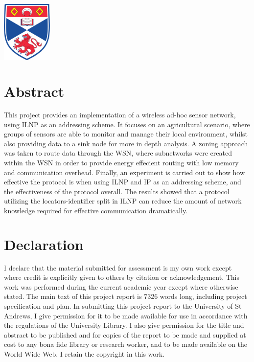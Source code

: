 \documentclass[12pt]{article}
\begin{document}
\begin{titlepage}
\includegraphics[width = 2.5cm]{images/standrewslogo.png}
 

\vfill %

\end{titlepage}


\part*{Abstract}

This project provides an implementation of a wireless ad-hoc sensor network, using ILNP as an addressing scheme. It focuses on an agricultural scenario, where groups of sensors are able to monitor and manage their local environment, whilst also providing data to a sink node for more in depth analysis. A zoning approach was taken to route data through the WSN, where subnetworks were created within the WSN in order to provide energy effecient routing with low memory and communication overhead. Finally, an experiment is carried out to show how effective the protocol is when using ILNP and IP as an addressing scheme, and the effectiveness of the protocol overall. The results showed that a protocol utilizing the locators-identifier split in ILNP can reduce the amount of network knowledge required for effective communication dramatically.

\part*{Declaration}
I declare that the material submitted for
assessment is my own work except where credit is
explicitly given to others by citation or
acknowledgement. This work was performed during
the current academic year except where otherwise
stated.
The main text of this project report is 7326 words long, including project specification and plan.
In submitting this project report to the University of
St Andrews, I give permission for it to be made
available for use in accordance with the regulations of
the University Library. I also give permission for
the title and abstract to be published and for copies of
the report to be made and supplied at cost to any bona
fide library or research worker, and to be made
available on the World Wide Web. I retain the
copyright in this work.
\end{document}
